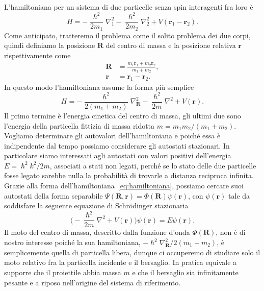 \documentclass[a4paper,fleqn,twoside,12pt]{article}
\begin{document}
L'hamiltoniana per un sistema di due particelle senza spin interagenti fra loro
è
\begin{equation}
  H = -\frac{\hslash^{2}}{2m_{1}} \nabla_{1}^{2}
  -\frac{\hslash^{2}}{2m_{2}}\nabla_{2}^{2} + V(\bm{r}_{1} - \bm{r}_{2}).
\end{equation}
Come anticipato, tratteremo il problema come il solito problema dei due corpi,
quindi definiamo la posizione $\bm{R}$ del centro di massa e la posizione
relativa $\bm{r}$ rispettivamente come
\begin{subequations}
  \begin{align}
    \bm{R} &= \frac{m_{1}\bm{r}_{1} + m_{2}\bm{r}_{2}}{m_{1} + m_{2}}, \\
    \bm{r} &= \bm{r}_{1} - \bm{r}_{2}.
  \end{align}
\end{subequations}
In questo modo l'hamiltoniana assume la forma più semplice
\begin{equation}
  \label{eq:hamiltoniana}
  H = -\frac{\hslash^{2}}{2(m_{1} + m_{2})}\nabla_{\bm{R}}^{2} -
  \frac{\hslash^{2}}{2m}\nabla^{2} + V(\bm{r}).
\end{equation}
Il primo termine è l'energia cinetica del centro di massa, gli ultimi due sono
l'energia della particella fittizia di massa ridotta
$m = m_{1}m_{2}/(m_{1}+m_{2})$.  Vogliamo determinare gli autovalori
dell'hamiltoniana e poiché essa è indipendente dal tempo possiamo considerare
gli autostati stazionari.  In particolare siamo interessati agli autostati con
valori positivi dell'energia $E = \hslash^{2}k^{2}/2m$, associati a stati non
legati, perché se lo stato delle due particelle fosse legato sarebbe nulla la
probabilità di trovarle a distanza reciproca infinita.  Grazie alla forma
dell'hamiltoniana~\eqref{eq:hamiltoniana}, possiamo cercare suoi autostati della
forma separabile $\Psi(\bm{R}, \bm{r}) = \Phi(\bm{R})\psi(\bm{r})$, con
$\psi(\bm{r})$ tale da soddisfare la seguente equazione di Schrödinger
stazionaria
\begin{equation}
  \label{eq:schrodinger-stazionaria}
  \bigg(-\frac{\hslash^{2}}{2m}\nabla^{2} + V(\bm{r})\bigg)\psi(\bm{r})
  = E\psi(\bm{r}).
\end{equation}
Il moto del centro di massa, descritto dalla funzione d'onda $\Phi(\bm{R})$, non
è di nostro interesse poiché la sua hamiltoniana,
$-\hslash^{2}\nabla_{\bm{R}}^{2}/2(m_{1} + m_{2})$, è semplicemente quella di
particella libera, dunque ci occuperemo di studiare solo il moto relativo fra la
particella incidente e il bersaglio.  In pratica equivale a supporre che il
proiettile abbia massa $m$ e che il bersaglio sia infinitamente pesante e a
riposo nell'origine del sistema di riferimento.
\end{document}
